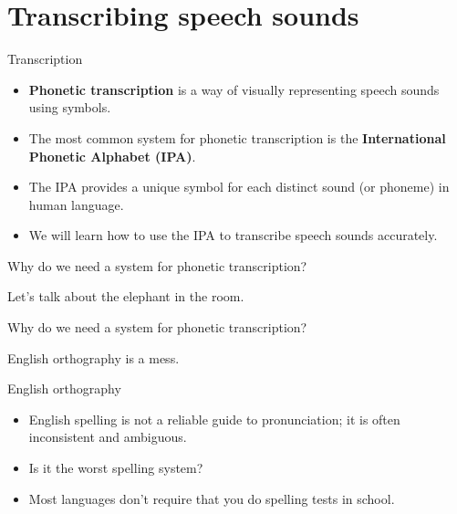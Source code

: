 \documentclass{beamer}
\begin{document}
\section{Transcribing speech sounds}

\begin{frame}{Transcription}
    \begin{itemize}
        \item \textbf{Phonetic transcription} is a way of visually representing speech sounds using symbols.
        \item The most common system for phonetic transcription is the \textbf{International Phonetic Alphabet (IPA)}.
        \item The IPA provides a unique symbol for each distinct sound (or phoneme) in human language.
        \item We will learn how to use the IPA to transcribe speech sounds accurately.
    \end{itemize}
\end{frame}

\begin{frame}{Why do we need a system for phonetic transcription?}
    \begin{center}
        \huge Let's talk about the elephant in the room.
    \end{center}
\end{frame}

\begin{frame}{Why do we need a system for phonetic transcription?}
    \begin{center}
        \huge English orthography is a mess. 
    \end{center}
\end{frame}

\begin{frame}{English orthography}
    \begin{itemize}
        \item English spelling is not a reliable guide to pronunciation; it is often inconsistent and ambiguous.
        \item Is it the worst spelling system? 
        \item Most languages don't require that you do spelling tests in school.
    \end{itemize}
\end{frame}
\end{document}
